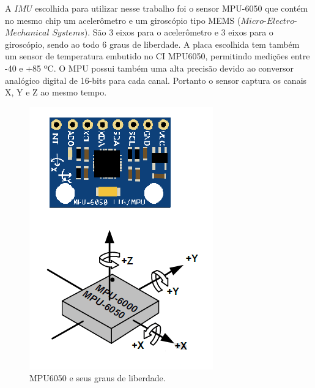 \begin{enumerate}
          A $IMU$ escolhida para utilizar nesse trabalho foi o sensor MPU-6050  que contém no mesmo chip um acelerômetro e um giroscópio tipo MEMS ($Micro$-$Electro$-$Mechanical$ $Systems$). São 3 eixos para o acelerômetro e 3 eixos para o giroscópio, sendo ao todo 6 graus de liberdade. A placa escolhida tem também um sensor de temperatura embutido no CI MPU6050, permitindo medições entre -40 e +85 ºC. O MPU possui também uma alta precisão devido ao conversor analógico digital de 16-bits para cada canal. Portanto o sensor captura os canais X, Y e Z ao mesmo tempo.

          \begin{figure}[h!]
              \centering
              \includegraphics[keepaspectratio=true,scale=0.7]{figuras/mpu.png}
              \centering
              \caption{MPU6050 e seus graus de liberdade.}
              \label{mpu}
          \end{figure}

			\end{enumerate}



